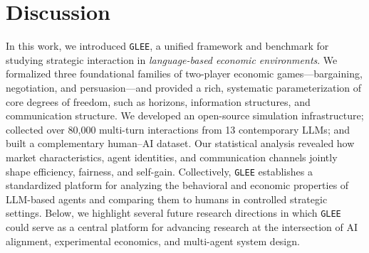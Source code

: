 
\section{Discussion}

In this work, we introduced \texttt{GLEE}, a unified framework and benchmark for studying strategic interaction in 
\emph{language-based economic environments}. We formalized three foundational families of two-player economic 
games---bargaining, negotiation, and persuasion---and provided a rich, systematic parameterization of core degrees of freedom, such as horizons, 
information structures, and communication structure. We developed an open-source simulation infrastructure; 
collected over 80,000 multi-turn interactions from 13 contemporary LLMs; and built a complementary human--AI 
dataset. Our statistical analysis revealed how market characteristics, agent 
identities, and communication channels jointly shape efficiency, fairness, and self-gain. Collectively, 
\texttt{GLEE} establishes a standardized platform for analyzing the behavioral and economic properties of 
LLM-based agents and comparing them to humans in controlled strategic settings. Below, we highlight several future research directions in which \texttt{GLEE} could serve as a central platform for advancing research at the intersection of AI alignment, experimental economics, and multi-agent system design.

